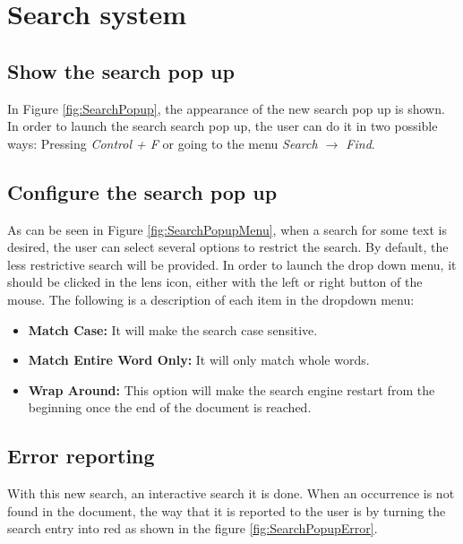 \chapter{Search system}

\section{Show the search pop up}

In Figure \ref{fig:SearchPopup}, the appearance of the new search pop up is shown. In order to launch the search search pop up, the user 
can do it in two possible ways:  Pressing \emph{Control + F} or going to the menu \emph{Search $\to$ Find}.


\section{Configure the search pop up}

As can be seen in Figure  \ref{fig:SearchPopupMenu}, when a search for some text is desired, the user can select 
several options to restrict the search. By default,  the less restrictive search will be provided. In order to  launch the drop 
down menu,  it should be clicked in the lens icon, either with the left or right button of the mouse. The 
following is a description of each item in the dropdown menu:
\begin{itemize}
  \item \textbf{Match Case:} It will make the search case sensitive.
  \item \textbf{Match Entire Word Only:} It will only match whole words.
  \item \textbf{Wrap Around:} This option will make the search engine restart from the beginning once the end of the document is reached.
\end{itemize}


\section{Error reporting}

With this new search, an interactive search it is done. When an occurrence is not found in the document,  the way that it is reported 
to the user is by turning the search entry into red as shown in the figure \ref{fig:SearchPopupError}.

